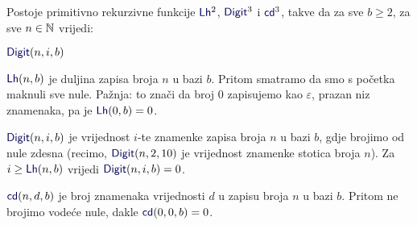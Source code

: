 \begin{lema}\label{lm:LhDigitcdprn}
Postoje primitivno rekurzivne funkcije $\f{Lh}^2$, $\f{Digit}^3$ i $\f{cd}^3$, takve da za sve $b\ge 2$, za sve $n\in{\mathbb N}$ vrijedi:
\begin{labeling}{$\f{Digit}(n,i,b)$}
    \item[$\f{Lh}(n,b)$] je duljina zapisa broja $n$ u bazi $b$. Pritom smatramo da smo s početka maknuli sve nule. Pažnja: to znači da broj $0$ zapisujemo kao $\varepsilon$, prazan niz znamenaka, pa je $\f{Lh}(0,b)=0$.
    \item[$\f{Digit}(n,i,b)$] je vrijednost $i$-te znamenke zapisa broja $n$ u bazi $b$, gdje brojimo od nule zdesna (recimo, $\f{Digit}(n,2,10)$ je vrijednost znamenke stotica broja $n$). Za $i\ge\f{Lh}(n,b)$ vrijedi $\f{Digit}(n,i,b)=0$.
    \item[$\f{cd}(n,d,b)$] je broj znamenaka vrijednosti $d$ u zapisu broja $n$ u bazi $b$. Pritom ne brojimo vodeće nule, dakle $\f{cd}(0,0,b)=0$.
\end{labeling}
\end{lema}
